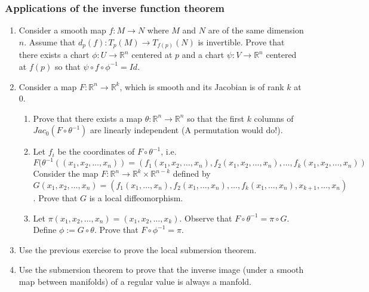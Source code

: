 \subsubsection{Applications of the inverse function theorem}
\begin{enumerate}
\item Consider a smooth map $f : M \to N$ where $M$ and $N$ are of the same dimension $n$. Assume that $d_p(f) : T_p(M) \to T_{f(p)}(N)$ is invertible. Prove that there exists a chart $\phi : U \to \mathbb{R}^n$ centered at $p$ and a chart $\psi : V \to \mathbb{R}^n$ centered at $f(p)$ so that $\psi \circ f \circ \phi^{-1} = Id$.

\item Consider a map $F : \mathbb{R}^n \to \mathbb{R}^k$, which is smooth and its Jacobian is of rank $k$ at $0$. 
  \begin{enumerate}
\item Prove that there exists a map $\theta : \mathbb{R}^n \to \mathbb{R}^n$ so that the first $k$ columns of $Jac_0(F \circ \theta^{-1})$ are linearly independent (A permutation would do!).

\item Let $f_i$ be the coordinates of $F\circ \theta^{-1}$, i.e.\\ $F(\theta^{-1}((x_1, x_2, \ldots, x_n)) = (f_1(x_1, x_2, \ldots, x_n), f_2(x_1, x_2, \ldots, x_n), \ldots, f_k(x_1, x_2, \ldots, x_n))$
  Consider the map $F : \mathbb{R}^n \to \mathbb{R}^k \times \mathbb{R}^{n-k}$ defined by $G(x_1, x_2, \ldots, x_n) = (f_1(x_1, \ldots, x_n), f_2(x_1, \ldots, x_n), \ldots, f_k(x_1, \ldots, x_n), x_{k+1}, \ldots, x_n)$. Prove that $G$ is a local diffeomorphism.

    \item Let $\pi(x_1, x_2, \ldots, x_n) = (x_1, x_2, \ldots, x_k)$. Observe that $F\circ \theta^{-1} = \pi \circ G$. Define $\phi := G \circ \theta$. Prove that $F \circ \phi^{-1} = \pi$.
  \end{enumerate}

\item Use the previous exercise to prove the local submersion theorem.

  \item Use the submersion theorem to prove that the inverse image (under a smooth map between manifolds) of a regular value is always a manfold.


\end{enumerate}
